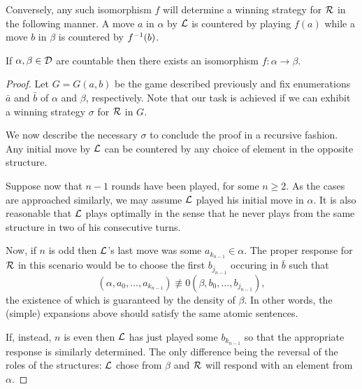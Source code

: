 Conversely, any such isomorphism $f$ will determine a winning strategy for
$\mathcal{R}$ in the following manner.  A move $a$ in $\alpha$ by $\mathcal{L}$ is
countered by playing $f(a)$ while a move $b$ in $\beta$ is countered by
${f}^{-1}(b)$.

\begin{thm}\label{thm:cantor} If $\alpha,\beta\in\mathcal{D}$ are
	countable then there exists an isomorphism $f\colon\alpha\to\beta$.
\end{thm}
\begin{proof} Let $G=G(a,b)$ be the game described previously and fix
	enumerations $\bar{a}$ and $\bar{b}$ of $\alpha$ and $\beta$, respectively.
	Note that our task is achieved if we can exhibit a winning strategy $\sigma$ for
	$\mathcal{R}$ in $G$.

	We now describe the necessary $\sigma$ to conclude the proof in a recursive
	fashion.  Any initial move by $\mathcal{L}$ can be countered by any choice of element
	in the opposite structure.

	Suppose now that $n-1$ rounds have been played, for some $n\geq 2$.  As the
	cases are approached similarly, we may assume $\mathcal{L}$ played his initial move in
	$\alpha$.  It is also reasonable that $\mathcal{L}$ plays optimally in the sense that
	he never plays from the same structure in two of his consecutive turns.

	Now, if $n$ is odd then $\mathcal{L}$'s last move was some $a_{k_{n-1}}\in\alpha$.
	The proper response for $\mathcal{R}$ in this scenario would be to choose the first
	$b_{j_{n-1}}$ occuring in $\bar{b}$ such that
	\begin{equation} (\alpha,a_{0},\dotsc,a_{k_{n-1}})\nequiv{0}(\beta,b_{0},\dotsc,b_{j_{n-1}}),
	\end{equation} the existence of which is guaranteed by the density of
	$\beta$.  In other words, the (simple) expansions above should satisfy the same
	atomic sentences.

	If, instead, $n$ is even then $\mathcal{L}$ has just played some $b_{k_{n-1}}$ so
	that the appropriate response is similarly determined.  The only difference
	being the reversal of the roles of the structures: $\mathcal{L}$ chose from $\beta$
	and $\mathcal{R}$ will respond with an element from $\alpha$.
\end{proof}

